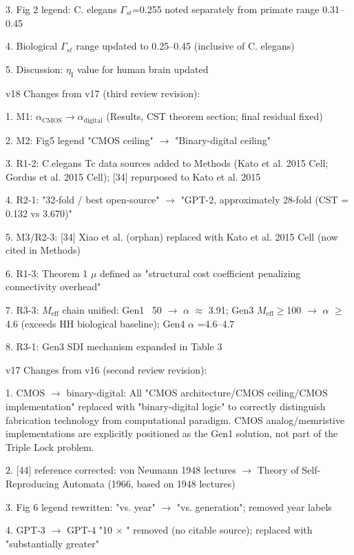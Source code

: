 \documentclass[a4paper,12pt]{article}
\begin{document}
3. Fig 2 legend: C. elegans $\Gamma_{st}$=0.255 noted separately from primate range 0.31--0.45

4. Biological $\Gamma_{st}$ range updated to 0.25--0.45 (inclusive of C. elegans)

5. Discussion: $\eta_{\text{I}}$ value for human brain updated

v18 Changes from v17 (third review revision):

1. M1: $\alpha_{\text{CMOS}} \rightarrow \alpha_{\text{digital}}$ (Results, CST theorem section; final residual fixed)

2. M2: Fig5 legend "CMOS ceiling"  $\rightarrow$  "Binary-digital ceiling"

3. R1-2: C.elegans Tc data sources added to Methods (Kato et al. 2015 Cell; Gordus et al. 2015 Cell); [34] repurposed to Kato et al. 2015

4. R2-1: "32-fold / best open-source"  $\rightarrow$  "GPT-2, approximately 28-fold (CST = 0.132 vs 3.670)"

5. M3/R2-3: [34] Xiao et al. (orphan) replaced with Kato et al. 2015 Cell (now cited in Methods)

6. R1-3: Theorem 1  $\mu$  defined as "structural cost coefficient penalizing connectivity overhead"

7. R3-3: $M_{\text{eff}}$ chain unified: Gen1 ~50 $\rightarrow$ $\alpha$ $\approx$ 3.91; Gen3 $M_{\text{eff}}\geq$100 $\rightarrow$ $\alpha$ $\geq$ 4.6 (exceeds HH biological baseline); Gen4  $\alpha$ =4.6--4.7

8. R3-1: Gen3 SDI mechanism expanded in Table 3

v17 Changes from v16 (second review revision):

1. CMOS $\rightarrow$ binary-digital: All "CMOS architecture/CMOS ceiling/CMOS implementation" replaced with "binary-digital logic" to correctly distinguish fabrication technology from computational paradigm. CMOS analog/memristive implementations are explicitly positioned as the Gen1 solution, not part of the Triple Lock problem.

2. [44] reference corrected: von Neumann 1948 lectures  $\rightarrow$  Theory of Self-Reproducing Automata (1966, based on 1948 lectures)

3. Fig 6 legend rewritten: "vs. year"  $\rightarrow$  "vs. generation"; removed year labels

4. GPT-3 $\rightarrow$ GPT-4 "10 $\times$ " removed (no citable source); replaced with "substantially greater"
\end{document}

